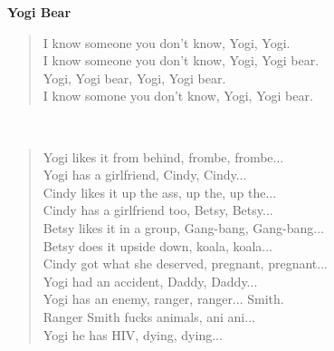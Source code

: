 %
%
\noindent\begin{minipage}{\linewidth}
\vspace{5pt}
\parbox[t]{0.85\linewidth}{\raggedright {\large\bf Yogi Bear}\\[6pt]}
\begin{verse}
	I know someone you don't know, Yogi, Yogi.\\
	I know someone you don't know, Yogi, Yogi bear.\\
	Yogi, Yogi bear, Yogi, Yogi bear.\\
	I know somone you don't know, Yogi, Yogi bear.\\
\end{verse}
\end{minipage}\\[10pt]
\noindent\begin{minipage}{\linewidth}
\begin{verse}
	Yogi likes it from behind, frombe, frombe...\\
	Yogi has a girlfriend, Cindy, Cindy...\\
	Cindy likes it up the ass, up the, up the...\\
	Cindy has a girlfriend too, Betsy, Betsy...\\
	Betsy likes it in a group, Gang-bang, Gang-bang...\\
	Betsy does it upside down, koala, koala...\\
	Cindy got what she deserved, pregnant, pregnant...\\
	Yogi had an accident, Daddy, Daddy...\\
	Yogi has an enemy, ranger, ranger... Smith.\\
	Ranger Smith fucks animals, ani ani...\\
	Yogi he has HIV, dying, dying...\\
\end{verse}
\end{minipage}\\[10pt]
